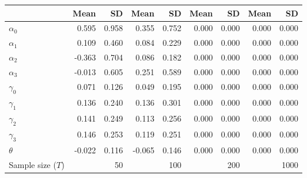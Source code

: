 
\begin{tabular}[t]{lrrrrrrrr}
\toprule
  & Mean & SD & Mean  & SD  & Mean   & SD   & Mean    & SD   \\
\midrule
$\alpha_{0}$ & 0.595 & 0.958 & 0.355 & 0.752 & 0.000 & 0.000 & 0.000 & 0.000\\
$\alpha_{1}$ & 0.109 & 0.460 & 0.084 & 0.229 & 0.000 & 0.000 & 0.000 & 0.000\\
$\alpha_{2}$ & -0.363 & 0.704 & 0.086 & 0.182 & 0.000 & 0.000 & 0.000 & 0.000\\
$\alpha_{3}$ & -0.013 & 0.605 & 0.251 & 0.589 & 0.000 & 0.000 & 0.000 & 0.000\\
$\gamma_{0}$ & 0.071 & 0.126 & 0.049 & 0.195 & 0.000 & 0.000 & 0.000 & 0.000\\
$\gamma_{1}$ & 0.136 & 0.240 & 0.136 & 0.301 & 0.000 & 0.000 & 0.000 & 0.000\\
$\gamma_{2}$ & 0.141 & 0.249 & 0.113 & 0.256 & 0.000 & 0.000 & 0.000 & 0.000\\
$\gamma_{3}$ & 0.146 & 0.253 & 0.119 & 0.251 & 0.000 & 0.000 & 0.000 & 0.000\\
$\theta$ & -0.022 & 0.116 & -0.065 & 0.146 & 0.000 & 0.000 & 0.000 & 0.000\\
Sample size ($T$) &  & 50 &  & 100 &  & 200 &  & 1000\\
\bottomrule
\end{tabular}

